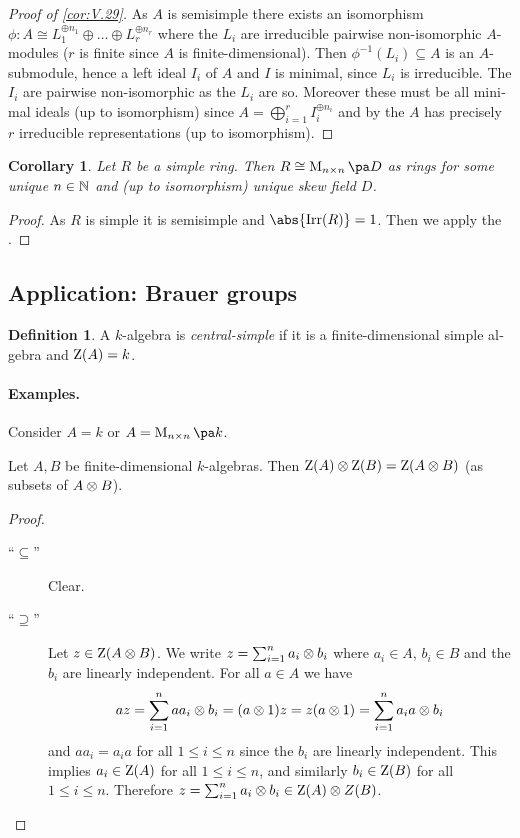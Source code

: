 \documentclass[12pt,a4paper]{scrartcl}
\theoremstyle{cplain}
\newtheorem{cor}[thmcounter]{Corollary}
\theoremstyle{cplain}
\theoremstyle{cplain}
\theoremstyle{definition}
\newtheorem*{deff}{Definition}
\begin{document}
\begin{otherlanguage}{english}
\begin{proof}[Proof of \cref{cor:V.29}]
  As $A$ is semisimple there exists an isomorphism $\phi\colon A \cong L_1^{\oplus n_1}\oplus\ldots\oplus L_r^{\oplus n_r}$ where the $L_i$ are irreducible pairwise non-isomorphic $A$-modules ($r$ is finite since $A$ is finite-dimensional). Then $\phi^{-1}(L_i) \subseteq A$ is an $A$-submodule, hence a left ideal $I_i$ of $A$ and $I$ is minimal, since $L_i$ is irreducible. The $I_i$ are pairwise non-isomorphic as the $L_i$ are so. Moreover these must be all minimal ideals (up to isomorphism) since $A = \bigoplus_{i=1}^rI_i^{\oplus n_i}$ and by the  $A$ has precisely $r$ irreducible representations (up to isomorphism).
\end{proof}

\begin{cor}
  Let $R$ be a simple ring. Then $R\cong \Mat nD$ as rings for some unique $n\in\mathbb N$ and (up to isomorphism) unique skew field $D$.
\end{cor}
\begin{proof}
  As $R$ is simple it is semisimple and $\abs{\Irr(R)} = 1$. Then we apply the .
\end{proof}

\subsection{Application: Brauer groups}
\begin{deff}
  A $k$-algebra is \emph{central-simple} if it is a finite-dimensional simple algebra and $\operatorname{Z}(A) = k$.
\end{deff}

\paragraph{Examples.} Consider $A=k$ or $A = \Mat nk$.

\begin{lem}
  Let $A,B$ be finite-dimensional $k$-algebras. Then $\operatorname{Z}(A)\otimes \operatorname{Z}(B) = \operatorname{Z}(A\otimes B)$ (as subsets of $A\otimes B$).
\end{lem}
\begin{proof}
  \leavevmode
  \begin{description}
    \item[\enquote{$\subseteq$}] Clear.
    \item[\enquote{$\supseteq$}] Let $z\in \operatorname{Z}(A\otimes B)$. We write $z=\sum_{i=1}^na_i\otimes b_i$ where $a_i\in A$, $b_i\in B$ and the $b_i$ are linearly independent. For all $a\in A$ we have \[ az = \sum_{i=1}^n aa_i\otimes b_i  = (a\otimes 1)z = z(a\otimes 1) = \sum_{i=1}^na_ia\otimes b_i \] and $aa_i = a_ia$ for all $1\le i\le n$ since the $b_i$ are linearly independent. This implies $a_i\in \operatorname{Z}(A)$ for all $1\le i\le n$, and similarly $b_i\in\operatorname{Z}(B)$ for all $1\le i\le n$. Therefore $z=\sum_{i=1}^na_i\otimes b_i \in\operatorname{Z}(A)\otimes Z(B)$.
    \qedhere
  \end{description}
\end{proof}


\end{otherlanguage}
\end{document}
